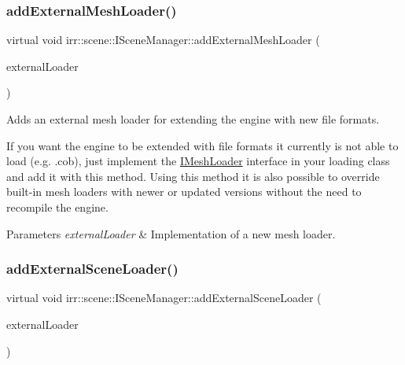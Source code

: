 \subsubsection{\texorpdfstring{add\+External\+Mesh\+Loader()}{addExternalMeshLoader()}}
{\footnotesize\ttfamily virtual void irr\+::scene\+::\+I\+Scene\+Manager\+::add\+External\+Mesh\+Loader (\begin{DoxyParamCaption}\item[{\hyperlink{classirr_1_1scene_1_1IMeshLoader}{I\+Mesh\+Loader} $\ast$}]{external\+Loader }\end{DoxyParamCaption})\hspace{0.3cm}{\ttfamily [pure virtual]}}



Adds an external mesh loader for extending the engine with new file formats. 

If you want the engine to be extended with file formats it currently is not able to load (e.\+g. .cob), just implement the \hyperlink{classirr_1_1scene_1_1IMeshLoader}{I\+Mesh\+Loader} interface in your loading class and add it with this method. Using this method it is also possible to override built-\/in mesh loaders with newer or updated versions without the need to recompile the engine. 
\begin{DoxyParams}{Parameters}
{\em external\+Loader} & Implementation of a new mesh loader. \\
\hline
\end{DoxyParams}
\mbox{\label{classirr_1_1scene_1_1ISceneManager_a8f0bc0221c4faaca80ac8f560ee424ef}} 
\subsubsection{\texorpdfstring{add\+External\+Scene\+Loader()}{addExternalSceneLoader()}}
{\footnotesize\ttfamily virtual void irr\+::scene\+::\+I\+Scene\+Manager\+::add\+External\+Scene\+Loader (\begin{DoxyParamCaption}\item[{\hyperlink{classirr_1_1scene_1_1ISceneLoader}{I\+Scene\+Loader} $\ast$}]{external\+Loader }\end{DoxyParamCaption})\hspace{0.3cm}{\ttfamily [pure virtual]}}



